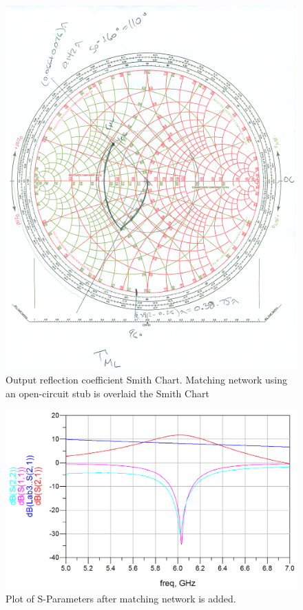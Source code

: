 \documentclass[conference]{IEEEtran}
\begin{document}
\begin{figure}[!h]
\centering
\includegraphics[scale=0.5]{pic/smith2.png}
\caption{Output reflection coefficient Smith Chart.  Matching network using an open-circuit stub is overlaid the Smith Chart}
\label{fig:smith2}
\end{figure}

\begin{figure}[!h]
\centering
\includegraphics[scale=0.25]{pic/2.png}
\caption{Plot of S-Parameters after matching network is added.}
\label{fig:2}
\end{figure}
\end{document}
